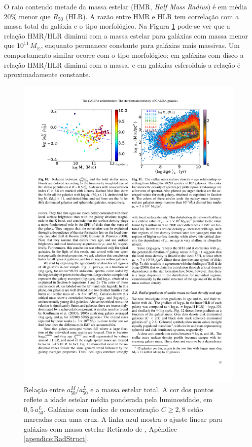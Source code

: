 O raio contendo metade da massa estelar (HMR, {\em Half Mass Radius}) é em média
20\% menor que $R_{50}$ (HLR). A razão entre HMR e HLR tem correlação com a
massa total da galáxia e o tipo morfológico. Na Figura \ref{fig:radStruct2}
pode-se ver que a relação HMR/HLR diminui com a massa estelar para galáxias com
massa menor que $10^{11}\,M_\odot$, enquanto permanece constante para galáxias
mais massivas. Um comportamento similar ocorre com o tipo morfológico:
em galáxias com disco a relação HMR/HLR diminui com a massa, e em galáxias
esferoidais a relação é aproximadamente constante.

\begin{figure}
	\includegraphics{figuras/radstruct-02}
	\caption[Relação entre $a^M_{50}/a^L_{50}$ e a massa estelar total]
	{Relação entre $a^M_{50}/a^L_{50}$ e a massa estelar total. A cor dos
	pontos reflete a idade estelar média ponderada pela luminosidade, em $0,5\,a^L_{50}$.
	Galáxias com índice de concentração $C \geq 2,8$ estão marcadas com uma cruz. A
	linha azul mostra o ajuste linear para galáxias com massa estelar Retirado de
	\cite[figura 10]{GonzalezDelgado2014a}, Apêndice
	\ref{apendice:RadStruct}.}
	\label{fig:radStruct2}
\end{figure}

